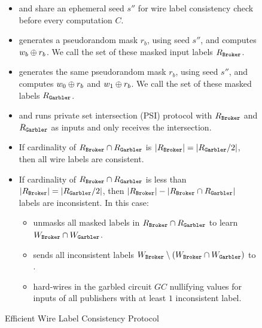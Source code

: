 \begin{figure}[h]
\begin{mdframed}[style=myframe]

\begin{itemize}[leftmargin=*,itemsep=4pt]

	\item \broker and \garbler share an ephemeral seed $s''$ for wire label
		consistency check before every computation $C$.

	\item \broker generates a pseudorandom mask $r_b$, using seed $s''$, and
		computes $w_b \oplus r_b$. We call the set of these masked input labels
		$R_\texttt{Broker}$. 

	\item \garbler generates the same pseudorandom mask $r_b$, using seed
		$s''$, and computes $w_0 \oplus r_b$ and $w_1 \oplus r_b$. We call the set of
		these masked labels $R_\texttt{Garbler}$.

	\item \broker and \garbler runs private set intersection (PSI) protocol with
		$R_\texttt{Broker}$ and $R_\texttt{Garbler}$ as inputs and only \broker receives the
		intersection.
		
	\item	If cardinality of $R_\texttt{Broker} \cap R_\texttt{Garbler}$ is $|R_\texttt{Broker}| =
		|R_\texttt{Garbler} / 2|$, then all wire labels are consistent. 

		\item If cardinality of $R_\texttt{Broker} \cap R_\texttt{Garbler}$ is less than
			$|R_\texttt{Broker}| = |R_\texttt{Garbler} / 2|$, then $|R_\texttt{Broker}| - |R_\texttt{Broker} \cap
			R_\texttt{Garbler}|$ labels are inconsistent. In this case:

			\begin{itemize}[leftmargin=*,itemsep=4pt,topsep=4pt]

					\item \broker unmasks all masked labels in $R_\texttt{Broker} \cap
						R_\texttt{Garbler}$ to learn $W_\texttt{Broker} \cap W_\texttt{Garbler}$.

					\item \broker sends all inconsistent labels $W_\texttt{Broker} \setminus
						(W_\texttt{Broker} \cap W_\texttt{Garbler})$ to \garbler. 
						
					\item \garbler hard-wires in the garbled circuit $GC$ nullifying
						values for inputs of all publishers with at least $1$ inconsistent
						label.
						
			\end{itemize}
			
\end{itemize}

\end{mdframed}
\caption{Efficient Wire Label Consistency Protocol}
\label{fig:econsistency}
\end{figure}
